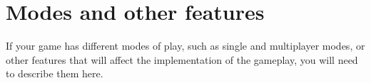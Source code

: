 \section{Modes and other features} %
If your game has different modes of play, such as single and multiplayer modes,
or other features that will affect the implementation of the gameplay, you will
need to describe them here.